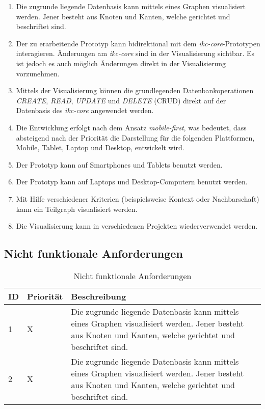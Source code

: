 \begin{enumerate}
    \item Die zugrunde liegende Datenbasis kann mittels eines Graphen visualisiert werden. Jener besteht aus Knoten und Kanten, welche gerichtet und beschriftet sind.
    \item Der zu erarbeitende Prototyp kann bidirektional mit dem \textit{ikc-core}-Prototypen interagieren. Änderungen am \textit{ikc-core} sind in der Visualisierung sichtbar. Es ist jedoch es auch möglich Änderungen direkt in der Visualisierung vorzunehmen.
    \item Mittels der Visualisierung können die grundlegenden Datenbankoperationen \textit{CREATE}, \textit{READ}, \textit{UPDATE} und \textit{DELETE} (CRUD) direkt auf der Datenbasis des \textit{ikc-core} angewendet werden.
    \item Die Entwicklung erfolgt nach dem Ansatz \textit{mobile-first}, was bedeutet, dass absteigend nach der Priorität die Darstellung für die folgenden Plattformen, Mobile, Tablet, Laptop und Desktop, entwickelt wird.
    \item Der Prototyp kann auf Smartphones und Tablets benutzt werden.
    \item Der Prototyp kann auf Laptops und Desktop-Computern benutzt werden.
    \item Mit Hilfe verschiedener Kriterien (beispielsweise Kontext oder Nachbarschaft) kann ein Teilgraph visualisiert werden.
    \item Die Visualisierung kann in verschiedenen Projekten wiederverwendet werden.
\end{enumerate}

\subsection{Nicht funktionale Anforderungen}

\begin{table}
  \centering
  \begin{tabular}{|p{0.4cm} | p{1.3cm} | p{8cm}|}
  \hline
     ID & Priorität & Beschreibung \\\hline
     1 & X & Die zugrunde liegende Datenbasis kann mittels eines Graphen visualisiert werden. Jener besteht aus Knoten und Kanten, welche gerichtet und beschriftet sind.\\\hline
     2 & X & Die zugrunde liegende Datenbasis kann mittels eines Graphen visualisiert werden. Jener besteht aus Knoten und Kanten, welche gerichtet und beschriftet sind.\\\hline
     
  \end{tabular}
    \caption{Nicht funktionale Anforderungen}
  \label{tab:nicht-funktionale-anforderungen}
\end{table}

